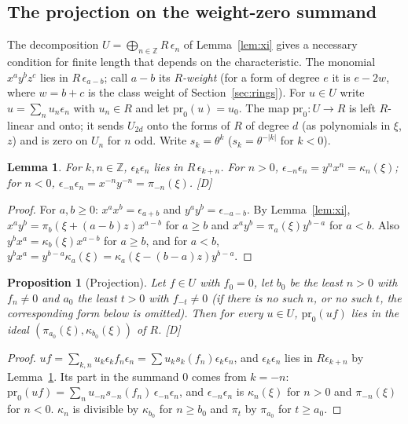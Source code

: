 \documentclass[11pt]{article}
\newtheorem{proposition}{Proposition}
\newtheorem{lemma}{Lemma}
\theoremstyle{definition}
\theoremstyle{remark}
\begin{document}
\subsection{The projection on the weight-zero summand}
\label{sec:wzero}

The decomposition $U=\bigoplus_{n\in\mathbb Z}R\,\epsilon_n$ of Lemma~\ref{lem:xi} gives a necessary condition for finite length that depends on the characteristic. The monomial $x^ay^bz^c$ lies in $R\,\epsilon_{a-b}$; call $a-b$ its \emph{$R$-weight} (for a form of degree $e$ it is $e-2w$, where $w=b+c$ is the class weight of Section~\ref{sec:rings}). For $u\in U$ write $u=\sum_nu_n\epsilon_n$ with $u_n\in R$ and let $\mathrm{pr}_0(u)=u_0$. The map $\mathrm{pr}_0:U\to R$ is left $R$-linear and onto; it sends $U_{2d}$ onto the forms of $R$ of degree $d$ (as polynomials in $\xi$, $z$) and is zero on $U_n$ for $n$ odd. Write $s_k=\theta^k$ ($s_k=\theta^{-|k|}$ for $k<0$).

\begin{lemma}\label{lem:prod}
For $k,n\in\mathbb Z$, $\epsilon_k\epsilon_n$ lies in $R\,\epsilon_{k+n}$. For $n>0$, $\epsilon_{-n}\epsilon_n=y^nx^n=\kappa_n(\xi)$; for $n<0$, $\epsilon_{-n}\epsilon_n=x^{-n}y^{-n}=\pi_{-n}(\xi)$. [D]
\end{lemma}
\begin{proof}
For $a,b\ge0$: $x^ax^b=\epsilon_{a+b}$ and $y^ay^b=\epsilon_{-a-b}$. By Lemma~\ref{lem:xi}, $x^ay^b=\pi_b(\xi+(a-b)z)x^{a-b}$ for $a\ge b$ and $x^ay^b=\pi_a(\xi)y^{b-a}$ for $a<b$. Also $y^bx^a=\kappa_b(\xi)x^{a-b}$ for $a\ge b$, and for $a<b$, $y^bx^a=y^{b-a}\kappa_a(\xi)=\kappa_a(\xi-(b-a)z)y^{b-a}$.
\end{proof}

\begin{proposition}[Projection]\label{prop:proj}
Let $f\in U$ with $f_0=0$, let $b_0$ be the least $n>0$ with $f_n\ne0$ and $a_0$ the least $t>0$ with $f_{-t}\ne0$ (if there is no such $n$, or no such $t$, the corresponding form below is omitted). Then for every $u\in U$, $\mathrm{pr}_0(uf)$ lies in the ideal $(\pi_{a_0}(\xi),\kappa_{b_0}(\xi))$ of $R$. [D]
\end{proposition}
\begin{proof}
$uf=\sum_{k,n}u_k\epsilon_kf_n\epsilon_n=\sum u_ks_k(f_n)\epsilon_k\epsilon_n$, and $\epsilon_k\epsilon_n$ lies in $R\epsilon_{k+n}$ by Lemma~\ref{lem:prod}. Its part in the summand $0$ comes from $k=-n$: $\mathrm{pr}_0(uf)=\sum_nu_{-n}s_{-n}(f_n)\,\epsilon_{-n}\epsilon_n$, and $\epsilon_{-n}\epsilon_n$ is $\kappa_n(\xi)$ for $n>0$ and $\pi_{-n}(\xi)$ for $n<0$. $\kappa_n$ is divisible by $\kappa_{b_0}$ for $n\ge b_0$ and $\pi_t$ by $\pi_{a_0}$ for $t\ge a_0$.
\end{proof}
\end{document}
